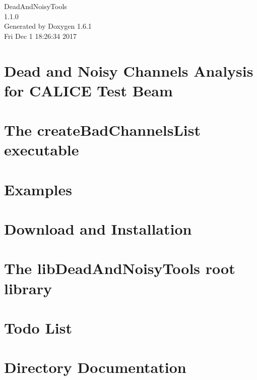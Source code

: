 \documentclass[a4paper]{book}
\begin{document}
\hypersetup{pageanchor=false}
\begin{titlepage}
\vspace*{7cm}
\begin{center}
{\Large DeadAndNoisyTools \\[1ex]\large 1.1.0 }\\
\vspace*{1cm}
{\large Generated by Doxygen 1.6.1}\\
\vspace*{0.5cm}
{\small Fri Dec 1 18:26:34 2017}\\
\end{center}
\end{titlepage}
\clearemptydoublepage
{}
\tableofcontents
\clearemptydoublepage
{}
\hypersetup{pageanchor=true}
\chapter{Dead and Noisy Channels Analysis for CALICE Test Beam}
\label{index}\hypertarget{index}{}
\chapter{The createBadChannelsList executable}
\label{createBadChannelsList_exe}
\hypertarget{createBadChannelsList_exe}{}

\chapter{Examples}
\label{Examples}
\hypertarget{Examples}{}

\chapter{Download and Installation}
\label{downloadInstall}
\hypertarget{downloadInstall}{}

\chapter{The libDeadAndNoisyTools root library}
\label{rootLib}
\hypertarget{rootLib}{}

\chapter{Todo List}
\label{todo}
\hypertarget{todo}{}

\chapter{Directory Documentation}




\end{document}
